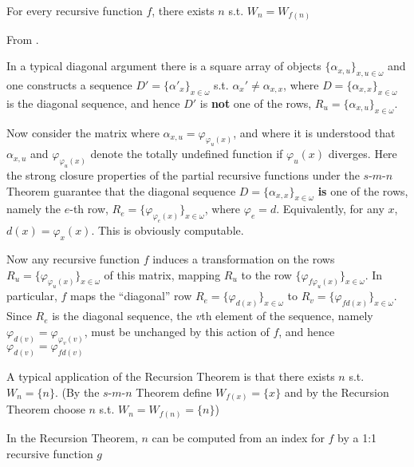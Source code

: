 \documentclass[11pt]{article}
\begin{document}
\begin{corollary}[]
\label{cor2.3.2}
For every recursive function \(f\), there exists \(n\) s.t. \(W_n=W_{f(n)}\)
\end{corollary}

\begin{remark}
From \cite{DBLP:journals/ndjfl/Owings73}.

In a typical diagonal argument there is a square array of objects
\(\{\alpha_{x,u}\}_{x,u\in\omega}\) and one constructs a sequence
\(D'=\{\alpha'_x\}_{x\in\omega}\) s.t. \(\alpha_x'\neq\alpha_{x,x}\), where
\(D=\{\alpha_{x,x}\}_{x\in\omega}\) is the diagonal sequence, and hence
\(D'\) is \textbf{not} one of the rows, \(R_u=\{\alpha_{x,u}\}_{x\in\omega}\).

Now
consider the matrix where \(\alpha_{x,u}=\varphi_{\varphi_u(x)}\), and where
it is understood that \(\alpha_{x,u}\) and \(\varphi_{\varphi_u(x)}\) denote
the totally undefined function if \(\varphi_u(x)\) diverges. Here the strong
closure properties of the partial recursive functions under the
\(s\)-\(m\)-\(n\) Theorem guarantee that the diagonal sequence
\(D=\{\alpha_{x,x}\}_{x\in\omega}\) \textbf{is} one of the rows, namely the \(e\)-th
row, \(R_e=\{\varphi_{\varphi_e(x)}\}_{x\in\omega}\), where \(\varphi_e=d\).
Equivalently, for any \(x\), \(d(x)=\varphi_x(x)\). This is obviously computable.

Now any recursive function \(f\) induces a transformation on the rows
\(R_u=\{\varphi_{\varphi_u(x)}\}_{x\in\omega}\) of this matrix, mapping
\(R_u\) to the row \(\{\varphi_{f\varphi_u(x)}\}_{x\in\omega}\). In
particular, \(f\) maps the ``diagonal'' row
\(R_e=\{\varphi_{d(x)}\}_{x\in\omega}\) to
\(R_v=\{\varphi_{fd(x)}\}_{x\in\omega}\). Since \(R_e\) is the diagonal
sequence, the \(v\)th element of the sequence, namely
\(\varphi_{d(v)}=\varphi_{\varphi_v(v)}\), must be unchanged by this action
of \(f\), and hence \(\varphi_{d(v)}=\varphi_{fd(v)}\)
\end{remark}

A typical application of the Recursion Theorem is that there exists \(n\)
s.t. \(W_n=\{n\}\). (By the \(s\)-\(m\)-\(n\) Theorem define
\(W_{f(x)}=\{x\}\) and by the Recursion Theorem choose \(n\) s.t.
\(W_n=W_{f(n)}=\{n\}\))

\begin{proposition}[]
In the Recursion Theorem, \(n\) can be computed from an index for \(f\) by a
1:1 recursive function \(g\)
\end{proposition}
\end{document}
